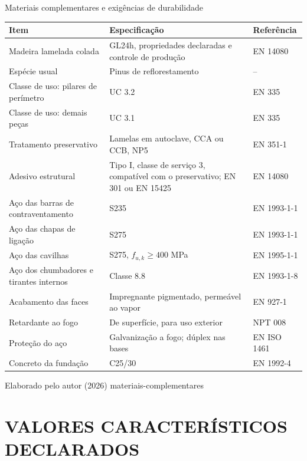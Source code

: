 \tabela
{Materiais complementares e exigências de durabilidade}
{\footnotesize
\begin{tabular}{p{4.9cm}p{5.0cm}l}
\toprule
    \textbf{Item} & \textbf{Especificação} & \textbf{Referência} \\
\midrule
    Madeira lamelada colada            & GL24h, propriedades declaradas e controle de produção & EN 14080 \cite{EN14080:2013} \\
    Espécie usual                      & Pinus de reflorestamento & -- \\
    Classe de uso: pilares de perímetro & UC 3.2    & EN 335 \cite{EN335:2013} \\
    Classe de uso: demais peças        & UC 3.1     & EN 335 \cite{EN335:2013} \\
    Tratamento preservativo            & Lamelas em autoclave, CCA ou CCB, NP5 & EN 351-1 \cite{EN351-1:2007} \\
    Adesivo estrutural                 & Tipo I, classe de serviço 3, compatível com o preservativo; EN 301 ou EN 15425 & EN 14080 \cite{EN14080:2013} \\
    Aço das barras de contraventamento & S235       & EN 1993-1-1 \cite{EN1993-1-1:2005} \\
    Aço das chapas de ligação          & S275       & EN 1993-1-1 \cite{EN1993-1-1:2005} \\
    Aço das cavilhas                   & S275, $f_{u,k} \geq 400$ MPa & EN 1995-1-1 \cite{EN1995-1-1:2004} \\
    Aço dos chumbadores e tirantes internos & Classe 8.8 & EN 1993-1-8 \cite{EN1993-1-8:2005} \\
    Acabamento das faces              & Impregnante pigmentado, permeável ao vapor & EN 927-1 \cite{EN927-1:2013} \\
    Retardante ao fogo                 & De superfície, para uso exterior & NPT 008 \cite{CBMPR-NPT008:2026} \\
    Proteção do aço                    & Galvanização a fogo; dúplex nas bases & EN ISO 1461 \cite{ENISO1461:2022} \\
    Concreto da fundação               & C25/30     & EN 1992-4 \cite{EN1992-4:2018} \\
\bottomrule
\end{tabular}}
{Elaborado pelo autor (2026)}
{materiais-complementares}
{}
{}

\section{VALORES CARACTERÍSTICOS DECLARADOS}\label{sec:valores-declarados}

